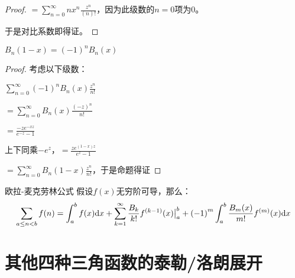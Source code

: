 \documentclass[12pt, a4paper, oneside, UTF8]{ctexbook}
\begin{document}
\begin{para}{0}
\begin{para}{1}
\begin{proof}
						$=\sum\limits_{n=0}^{\infty} n x^n \frac{z^{n}}{(n)!}$，因为此级数的$n=0$项为0。
						
						于是对比系数即得证。
					\end{proof}
				\point{}
					\begin{proposition}
						$B_n (1-x) = (-1)^n B_n(x)$
					\end{proposition}
					\begin{proof}
						考虑以下级数：
						
						$\sum\limits_{n=0}^{\infty} (-1)^n B_n(x) \frac{z^n}{n!}$
						
						$=\sum\limits_{n=0}^{\infty} B_n(x) \frac{(-z)^n}{n!}$
						
						$=\frac{-z e^{-xz}}{e^{-z}-1}$
						
						上下同乘$-e^z$，$=\frac{z e^{(1-x)z}}{e^z-1}$
						
						$=\sum\limits_{n=0}^{\infty} B_n(1-x) \frac{z^n}{n!}$，于是命题得证
					\end{proof}
			\end{para}
		\end{para}
		\begin{them}{欧拉-麦克劳林公式}{}
			假设$f(x)$无穷阶可导，那么：
			\begin{equation}
				\sum\limits_{a\leq n<b}f(n) = \int_{a}^{b}f(x)\mathrm{d} x+\sum\limits_{k=1}^{\infty}\frac{B_k}{k!}f^{(k-1)}(x)\big|_{a}^{b}+{(-1)}^{m}\int_{a}^{b}\frac{B_m({x})}{m!}f^{(m)}(x)\mathrm{d} x
			\end{equation}
			
		\end{them}
	
	\section{其他四种三角函数的泰勒/洛朗展开}
\end{document}
